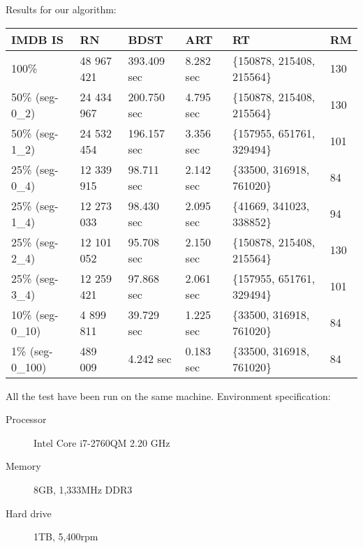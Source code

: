 Results for our algorithm:
\begin{table}[h]
\begin{tabular}{|l|l|l|l|l|l|}
\hline
IMDB IS          & RN & BDST  & ART & RT                     & RM  \\ \hline
100\%            & 48 967 421 & 393.409 sec & 8.282 sec    & \{150878, 215408, 215564\} & 130 \\ \hline
50\% (seg-0\_2)  & 24 434 967 & 200.750 sec & 4.795 sec    & \{150878, 215408, 215564\} & 130 \\ \hline
50\% (seg-1\_2)  & 24 532 454 & 196.157 sec & 3.356 sec    & \{157955, 651761, 329494\} & 101 \\ \hline
25\% (seg-0\_4)  & 12 339 915 & 98.711 sec  & 2.142 sec    & \{33500, 316918, 761020\}  & 84  \\ \hline
25\% (seg-1\_4)  & 12 273 033 & 98.430 sec  & 2.095 sec    & \{41669, 341023, 338852\}  & 94  \\ \hline
25\% (seg-2\_4)  & 12 101 052 & 95.708 sec  & 2.150 sec    & \{150878, 215408, 215564\} & 130 \\ \hline
25\% (seg-3\_4)  & 12 259 421 & 97.868 sec  & 2.061 sec    & \{157955, 651761, 329494\} & 101 \\ \hline
10\% (seg-0\_10) & 4 899 811  & 39.729 sec  & 1.225 sec    & \{33500, 316918, 761020\}  & 84  \\ \hline
1\% (seg-0\_100) & 489 009    & 4.242 sec   & 0.183 sec    & \{33500, 316918, 761020\}  & 84  \\ \hline
\end{tabular}
\end{table}

All the test have been run on the same machine. Environment specification:

\begin{description}
  \item[Processor] Intel Core i7-2760QM 2.20 GHz
  \item[Memory] 8GB, 1,333MHz DDR3
  \item[Hard drive] 1TB, 5,400rpm
\end{description}
